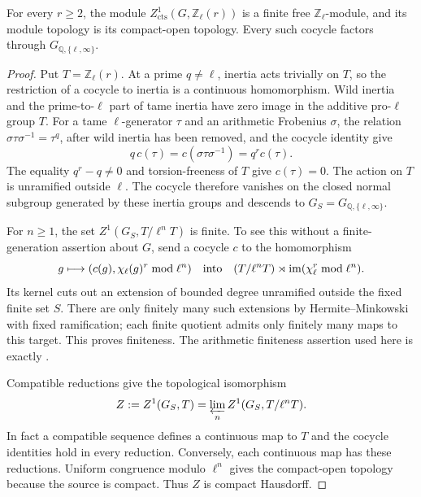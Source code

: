 \begin{lemma}
\label{lem:ghost-higher-z1}
For every \(r\geq2\), the module
\(Z^1_{\mathrm{cts}}(G,\mathbb Z_\ell(r))\) is a finite free
\(\mathbb Z_\ell\)-module, and its module topology is its
compact-open topology.  Every such cocycle factors through
\(G_{\mathbb Q,\{\ell,\infty\}}\).
\end{lemma}
\begin{proof}
Put \(T=\mathbb Z_\ell(r)\). At a prime \(q\ne\ell\), inertia
acts trivially on \(T\), so the restriction of a cocycle to inertia
is a continuous homomorphism. Wild inertia and the prime-to-\(\ell\)
part of tame inertia have zero image in the additive pro-\(\ell\)
group \(T\). For a tame \(\ell\)-generator \(\tau\) and an
arithmetic Frobenius \(\sigma\), the relation
\(\sigma\tau\sigma^{-1}=\tau^q\), after wild inertia has been
removed, and the cocycle identity give
\[
        q\,c(\tau)=c(\sigma\tau\sigma^{-1})
                    =q^r c(\tau).
\]
The equality \(q^r-q\ne0\) and torsion-freeness of \(T\) give
\(c(\tau)=0\). The action on \(T\) is unramified outside
\(\ell\). The cocycle therefore vanishes on the closed normal
subgroup generated by these inertia groups and descends to
\(G_S=G_{\mathbb Q,\{\ell,\infty\}}\).

For \(n\geq1\), the set \(Z^1(G_S,T/\ell^nT)\) is finite.
To see this without a finite-generation assertion about \(G\),
send a cocycle \(c\) to the homomorphism
\[
 g\longmapsto(c(g),\chi_\ell(g)^r\bmod\ell^n)
 \quad\hbox{into}\quad
 (T/\ell^nT)\rtimes\operatorname{im}(\chi_\ell^r\bmod\ell^n).
\]
Its kernel cuts out an extension of bounded degree unramified
outside the fixed finite set \(S\). There are only finitely many
such extensions by Hermite--Minkowski with fixed ramification;
each finite quotient admits only finitely many maps to this target.
This proves finiteness. The arithmetic finiteness assertion used
here is exactly \cite[Theorem~8.42]{GhostMilneANT}.

Compatible reductions give the topological isomorphism
\[
 Z:=Z^1(G_S,T)=\varprojlim_n Z^1(G_S,T/\ell^nT).
\]
In fact a compatible sequence defines a continuous map to \(T\)
and the cocycle identities hold in every reduction. Conversely,
each continuous map has these reductions. Uniform congruence
modulo \(\ell^n\) gives the compact-open topology because the
source is compact. Thus \(Z\) is compact Hausdorff.


\end{proof}
